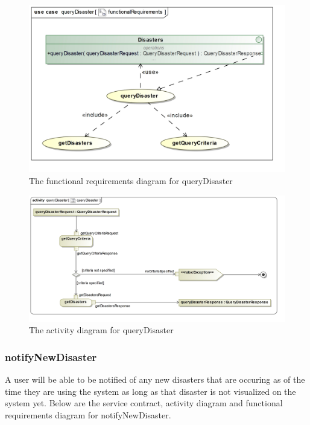 \begin{figure}[H]
	\centering
	\includegraphics[width=1.2\textwidth]{../images/funcReq/queryDisasterFunctionalRequirements.jpg}
	\caption{The functional requirements diagram for queryDisaster \label{overflow}}
\end{figure}

\begin{figure}[H]
	\centering
	\includegraphics[scale=0.2]{../images/funcReq/queryDisasterActivityDiagram.jpg}
	\caption{The activity diagram for queryDisaster \label{overflow}}
\end{figure} 

\subsubsection{notifyNewDisaster}

A user will be able to be notified of any new disasters that are occuring as of the time they are using the system as long as that disaster is not visualized on the system yet. Below are the service contract, activity diagram and functional requirements diagram for notifyNewDisaster.

